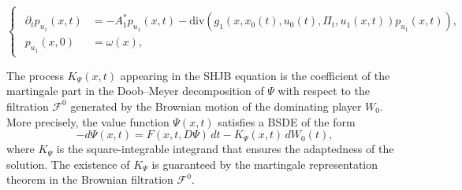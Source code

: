 \documentclass[10pt,a4paper]{amsart}
\begin{document}
\begin{equation}
    \label{Fokker-Planck}
    \begin{cases}
        \begin{aligned}
            \partial_t p_{u_1}(x,t) &= -A_1^* p_{u_1}(x,t)
            - \mathrm{div}\!\left(g_1\!\left(x,x_0(t),u_0(t), \Pi_t,u_1(x,t)\right)p_{u_1}(x,t)\right),\\[0.2cm]
            p_{u_1}(x,0) &= \omega(x),
        \end{aligned}
    \end{cases}
\end{equation}

\begin{obs*}
The process $K_\Psi(x,t)$ appearing in the SHJB equation is the coefficient of the martingale part in the Doob--Meyer decomposition of $\Psi$ with respect to the filtration $\mathcal{F}^0$ generated by the Brownian motion of the dominating player $W_0$. More precisely, the value function $\Psi(x,t)$ satisfies a BSDE of the form
$$-d\Psi(x,t) = F(x,t,D\Psi)\,dt - K_\Psi(x,t)\,dW_0(t),$$
where $K_\Psi$ is the square-integrable integrand that ensures the adaptedness of the solution. The existence of $K_\Psi$ is guaranteed by the martingale representation theorem in the Brownian filtration $\mathcal{F}^0$.
\end{obs*}
\end{document}
